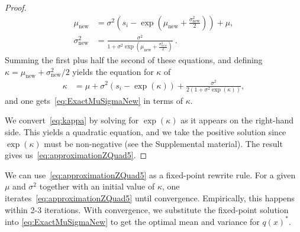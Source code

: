 \begin{proof}
%
\begin{align}
    \mu_{\text{new}} & = \sigma^{2}\left(s_i - \exp\left(\mu_{\text{new}}+\frac{\sigma_{\text{new}}^2}{2}\right)\right) + \mu, \nonumber \\
   \sigma_{\text{new}}^2 & = \frac{\sigma^2}{1+\sigma^2 \exp(\mu_{\text{new}}+\frac{\sigma_{new}^2}{2})}~.\nonumber
\end{align}
Summing the first plus half the second of these equations,
and defining $\kappa=\mu_{\text{new}}+\sigma_{\text{new}}^2/2$
yields the equation for $\kappa$ of
\begin{align}\label{eq:kappa}
    \kappa & = \mu + \sigma^2(s_i - \exp(\kappa)) + \frac{\sigma^2}{2(1+\sigma^2\exp(\kappa))},
\end{align}
and one gets~\eqref{eq:ExactMuSigmaNew} in terms of $\kappa$.

We convert~\eqref{eq:kappa} by solving for $\exp(\kappa)$
as it appears on the right-hand side.  This yields
a quadratic equation, and we take the positive solution since $\exp(\kappa)$
must be non-negative (see the Supplemental material).
The result gives us~\eqref{eq:approximationZQuad5}.
\end{proof}

We can use~\eqref{eq:approximationZQuad5}
as a fixed-point rewrite rule.
For a given $\mu$ and $\sigma^2$ together with an initial value of
$\kappa$, one iterates~\eqref{eq:approximationZQuad5} until
convergence.  Empirically, this happens within 2-3 iterations.
With convergence, we substitute the fixed-point solution
into \eqref{eq:ExactMuSigmaNew} to get the optimal mean
and variance for $q(x)^*$.



